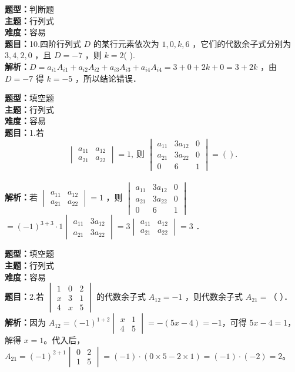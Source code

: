 \documentclass{ctexart}
\newenvironment{question}[5]{%
	\noindent\textbf{题型：}#1\\
	\textbf{主题：}#2\\
	\textbf{难度：}#3\\
	\textbf{题目：}#4\\
	\textbf{解析：}#5\\
	\vspace{1em}
}{}
\begin{document}
	\begin{question}
		{判断题}
		{行列式}
		{容易}
		{10.四阶行列式 $D$ 的某行元素依次为 $1,0,k,6$ ，它们的代数余子式分别为 $3,4,2,0$ ，且 $D=-7$ ，则 $k=2$(  ).}
		{$D=a_{i1} A_{i1}+a_{i2} A_{i2}+a_{i3} A_{i3}+a_{i4} A_{i4}=3+0+2k+0=3+2k$ ，由 $D=-7$ 得 $k=-5$ ，所以结论错误．}
	\end{question}
	
	\begin{question}
		{填空题}
		{行列式}
		{容易}
		{1.若
			$$
			\begin{vmatrix}
				a_{11} & a_{12} \\
				a_{21} & a_{22}
			\end{vmatrix}=1 \text {, 则 }\begin{vmatrix}
				a_{11} & 3 a_{12} & 0 \\
				a_{21} & 3 a_{22} & 0 \\
				0 & 6 & 1
			\end{vmatrix}= ( ).
			$$}
		{若 $\begin{vmatrix}a_{11} & a_{12} \\ a_{21} & a_{22}\end{vmatrix}=1$ ，则 $\begin{vmatrix}a_{11} & 3 a_{12} & 0 \\ a_{21} & 3 a_{22} & 0 \\ 0 & 6 & 1\end{vmatrix}$ $=(-1)^{3+3} \cdot 1\begin{vmatrix}a_{11} & 3 a_{12} \\ a_{21} & 3 a_{22}\end{vmatrix}=3\begin{vmatrix}a_{11} & a_{12} \\ a_{21} & a_{22}\end{vmatrix}=3$ ．} 
	\end{question}
	
	
	\begin{question}
		{填空题}
		{行列式}
		{容易}
		{2.若 $\begin{vmatrix}1 & 0 & 2 \\ x & 3 & 1 \\ 4 & x & 5\end{vmatrix}$ 的代数余子式 $A_{12}=-1$ ，则代数余子式 $A_{21}=$（ ）．}
		{因为 $A_{12}=(-1)^{1+2}\begin{vmatrix}x & 1 \\ 4 & 5\end{vmatrix}=-(5x-4)=-1$，可得 $5x-4=1$，解得 $x=1$。代入后，$A_{21}=(-1)^{2+1}\begin{vmatrix}0 & 2 \\ 1 & 5\end{vmatrix}=(-1)\cdot(0\times5 - 2\times1) = (-1)\cdot(-2)=2$。}
	\end{question}
	
\end{document}
